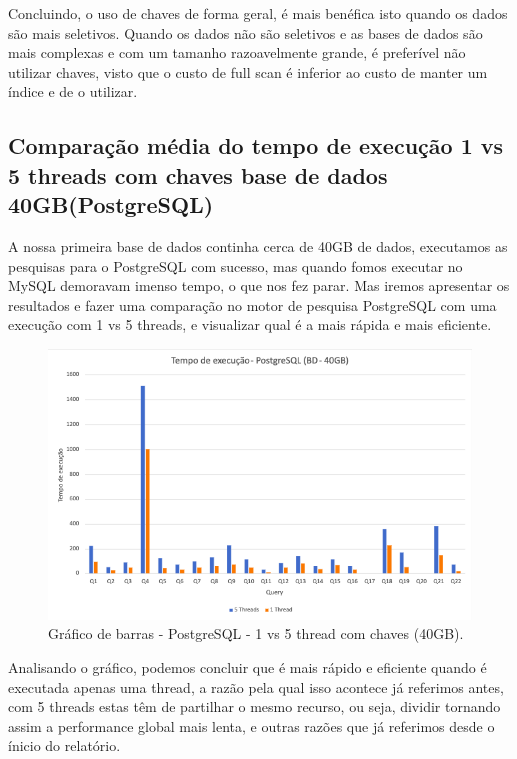 \documentclass{article}
\begin{document}
Concluindo, o uso de chaves de forma geral, é mais benéfica isto quando os dados são mais seletivos. Quando os dados não são seletivos e as bases de dados são mais complexas e com um tamanho razoavelmente grande, é preferível não utilizar chaves, visto que o custo de full scan é inferior ao custo de manter um índice e de o utilizar.
\clearpage
\subsection{Comparação média do tempo de execução 1 vs 5 threads com chaves base de dados 40GB(PostgreSQL)}

A nossa primeira base de dados continha cerca de 40GB de dados, executamos as pesquisas para o PostgreSQL com sucesso, mas quando fomos executar no MySQL demoravam imenso tempo, o que nos fez parar. Mas iremos apresentar os resultados e fazer uma comparação no motor de pesquisa PostgreSQL com uma execução com 1 vs 5 threads, e visualizar qual é a mais rápida e mais eficiente.

\begin{figure}[H]
  \centering
  \includegraphics[width=\textwidth]{Graphs/postgresql40gb.png}
  \caption{Gráfico de barras - PostgreSQL - 1 vs 5 thread com chaves (40GB).} 
  \label{fig:PKCreation2}
\end{figure}

Analisando o gráfico, podemos concluir que é mais rápido e eficiente quando é executada apenas uma thread, a razão pela qual isso acontece já referimos antes, com 5 threads estas têm de partilhar o mesmo recurso, ou seja, dividir tornando assim a performance global mais lenta, e outras razões que já referimos desde o ínicio do relatório. 

\clearpage
\end{document}
